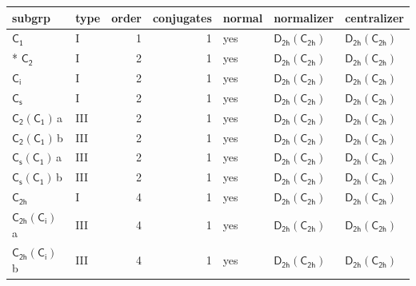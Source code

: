 \documentclass[10pt,a4paper]{article}
\numberwithin{equation}{section}
\newcommand{\grp}[1]{\mathsf{#1}}
\newcommand{\clsletter}[1]{\,{\scriptsize\color{black!55}#1}}
\begin{document}
{\small\begin{longtable}{@{}llrrlll@{}}\toprule
subgrp & type & order & conjugates & normal & normalizer & centralizer\\\midrule\endhead
\bottomrule\endfoot\endlastfoot
\href{../../../rotation/data/pdf/C1.pdf}{$\grp{C_{1}}$} & I & 1 & 1 & yes & \href{D2h-C2h.pdf}{$\grp{D_{2h}}(\grp{C_{2h}})$} & \href{D2h-C2h.pdf}{$\grp{D_{2h}}(\grp{C_{2h}})$}\\*
\href{../../../rotation/data/pdf/C2.pdf}{$\grp{C_{2}}$} & I & 2 & 1 & yes & \href{D2h-C2h.pdf}{$\grp{D_{2h}}(\grp{C_{2h}})$} & \href{D2h-C2h.pdf}{$\grp{D_{2h}}(\grp{C_{2h}})$}\\
\href{../../../rotation/data/pdf/S2.pdf}{$\grp{C_{i}}$} & I & 2 & 1 & yes & \href{D2h-C2h.pdf}{$\grp{D_{2h}}(\grp{C_{2h}})$} & \href{D2h-C2h.pdf}{$\grp{D_{2h}}(\grp{C_{2h}})$}\\
\href{../../../rotation/data/pdf/C1v.pdf}{$\grp{C_{s}}$} & I & 2 & 1 & yes & \href{D2h-C2h.pdf}{$\grp{D_{2h}}(\grp{C_{2h}})$} & \href{D2h-C2h.pdf}{$\grp{D_{2h}}(\grp{C_{2h}})$}\\
\href{C2-C1.pdf}{$\grp{C_{2}}(\grp{C_{1}})$}\clsletter{a} & III & 2 & 1 & yes & \href{D2h-C2h.pdf}{$\grp{D_{2h}}(\grp{C_{2h}})$} & \href{D2h-C2h.pdf}{$\grp{D_{2h}}(\grp{C_{2h}})$}\\
\href{C2-C1.pdf}{$\grp{C_{2}}(\grp{C_{1}})$}\clsletter{b} & III & 2 & 1 & yes & \href{D2h-C2h.pdf}{$\grp{D_{2h}}(\grp{C_{2h}})$} & \href{D2h-C2h.pdf}{$\grp{D_{2h}}(\grp{C_{2h}})$}\\
\href{C1v-C1.pdf}{$\grp{C_{s}}(\grp{C_{1}})$}\clsletter{a} & III & 2 & 1 & yes & \href{D2h-C2h.pdf}{$\grp{D_{2h}}(\grp{C_{2h}})$} & \href{D2h-C2h.pdf}{$\grp{D_{2h}}(\grp{C_{2h}})$}\\
\href{C1v-C1.pdf}{$\grp{C_{s}}(\grp{C_{1}})$}\clsletter{b} & III & 2 & 1 & yes & \href{D2h-C2h.pdf}{$\grp{D_{2h}}(\grp{C_{2h}})$} & \href{D2h-C2h.pdf}{$\grp{D_{2h}}(\grp{C_{2h}})$}\\
\href{../../../rotation/data/pdf/C2h.pdf}{$\grp{C_{2h}}$} & I & 4 & 1 & yes & \href{D2h-C2h.pdf}{$\grp{D_{2h}}(\grp{C_{2h}})$} & \href{D2h-C2h.pdf}{$\grp{D_{2h}}(\grp{C_{2h}})$}\\
\href{C2h-S2.pdf}{$\grp{C_{2h}}(\grp{C_{i}})$}\clsletter{a} & III & 4 & 1 & yes & \href{D2h-C2h.pdf}{$\grp{D_{2h}}(\grp{C_{2h}})$} & \href{D2h-C2h.pdf}{$\grp{D_{2h}}(\grp{C_{2h}})$}\\
\href{C2h-S2.pdf}{$\grp{C_{2h}}(\grp{C_{i}})$}\clsletter{b} & III & 4 & 1 & yes & \href{D2h-C2h.pdf}{$\grp{D_{2h}}(\grp{C_{2h}})$} & \href{D2h-C2h.pdf}{$\grp{D_{2h}}(\grp{C_{2h}})$}\\

\end{longtable}}
\end{document}
